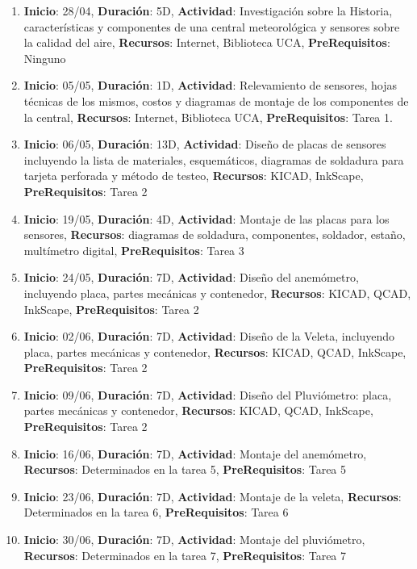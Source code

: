 \documentclass[a4paper,11pt, spanish]{article}
\begin{document}
\begin{enumerate}
\item \textbf{Inicio}: 28/04, \textbf{Duración}: 5D, \textbf{Actividad}: Investigación sobre la Historia, características y componentes de una central meteorológica y sensores sobre la calidad del aire, \textbf{Recursos}: Internet, Biblioteca UCA, \textbf{PreRequisitos}: Ninguno
\item \textbf{Inicio}: 05/05, \textbf{Duración}: 1D, \textbf{Actividad}: Relevamiento de sensores, hojas técnicas de los mismos, costos y diagramas de montaje de los componentes de la central, \textbf{Recursos}: Internet, Biblioteca UCA, \textbf{PreRequisitos}: Tarea 1.
\item \textbf{Inicio}: 06/05, \textbf{Duración}: 13D, \textbf{Actividad}: Diseño de placas de sensores incluyendo la lista de materiales, esquemáticos, diagramas de soldadura para tarjeta perforada y método de testeo, \textbf{Recursos}: KICAD, InkScape, \textbf{PreRequisitos}: Tarea 2
\item \textbf{Inicio}: 19/05, \textbf{Duración}: 4D, \textbf{Actividad}: Montaje de las placas para los sensores, \textbf{Recursos}: diagramas de soldadura, componentes, soldador, estaño, multímetro digital, \textbf{PreRequisitos}: Tarea 3
\item \textbf{Inicio}: 24/05, \textbf{Duración}: 7D, \textbf{Actividad}: Diseño del anemómetro, incluyendo placa, partes mecánicas y contenedor, \textbf{Recursos}: KICAD, QCAD, InkScape, \textbf{PreRequisitos}: Tarea 2
\item \textbf{Inicio}: 02/06, \textbf{Duración}: 7D, \textbf{Actividad}: Diseño de la Veleta, incluyendo placa, partes mecánicas y contenedor, \textbf{Recursos}: KICAD, QCAD, InkScape, \textbf{PreRequisitos}: Tarea 2
\item \textbf{Inicio}: 09/06, \textbf{Duración}: 7D, \textbf{Actividad}: Diseño del Pluviómetro: placa, partes mecánicas y contenedor, \textbf{Recursos}: KICAD, QCAD, InkScape, \textbf{PreRequisitos}: Tarea 2
\item \textbf{Inicio}: 16/06, \textbf{Duración}: 7D, \textbf{Actividad}: Montaje del anemómetro, \textbf{Recursos}: Determinados en la tarea 5, \textbf{PreRequisitos}: Tarea 5
\item \textbf{Inicio}: 23/06, \textbf{Duración}: 7D, \textbf{Actividad}: Montaje de la veleta, \textbf{Recursos}: Determinados en la tarea 6, \textbf{PreRequisitos}: Tarea 6
\item \textbf{Inicio}: 30/06, \textbf{Duración}: 7D, \textbf{Actividad}: Montaje del pluviómetro, \textbf{Recursos}: Determinados en la tarea 7, \textbf{PreRequisitos}: Tarea 7

\end{enumerate}
\end{document}
